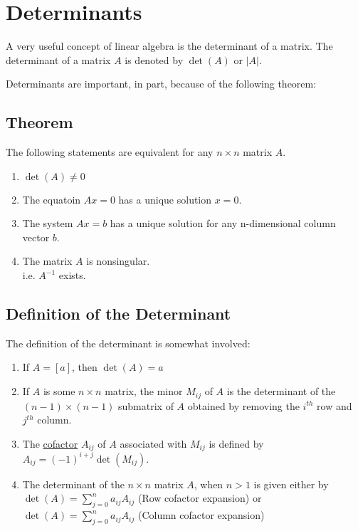 \section{Determinants}

A very useful concept of linear algebra is the determinant of a matrix. The
determinant of a matrix $A$ is denoted by $\det(A)$ or $|A|$.

Determinants are important, in part, because of the following theorem:

\subsection{Theorem}

The following statements are equivalent for any $n \times n$ matrix $A$.

\begin{enumerate}
  \item $\det(A) \neq 0$
  \item The equatoin $Ax = 0$ has a unique solution $x=0$.
  \item The system $Ax=b$ has a unique solution for any n-dimensional column
    vector $b$.
  \item The matrix $A$ is nonsingular.\\
    i.e. $A^{-1}$ exists.
\end{enumerate}

\subsection{Definition of the Determinant}

The definition of the determinant is somewhat involved:

\begin{enumerate}[label=(\alph*)]
  \item If $A=[a]$, then $\det(A) = a$
  \item If $A$ is some $n \times n$ matrix, the minor $M_{ij}$ of $A$ is the
    determinant of the $(n-1) \times (n-1)$ submatrix of $A$ obtained by 
    removing the $i^{th}$ row and $j^{th}$ column.
  \item The \uline{cofactor} $A_{ij}$ of $A$ associated with $M_{ij}$ is defined
    by $A_{ij} = (-1)^{i+j} \det(M_{ij})$.
  \item The determinant of the $n \times n$ matrix $A$, when $n>1$ is given
    either by 
    \subitem $\det(A) = \sum_{j = 0}^{n} {a_{ij} A_{ij}}$ (Row cofactor expansion) or
    \subitem $\det(A) = \sum_{j = 0}^{n} {a_{ij} A_{ij}}$ (Column cofactor expansion)
\end{enumerate}

